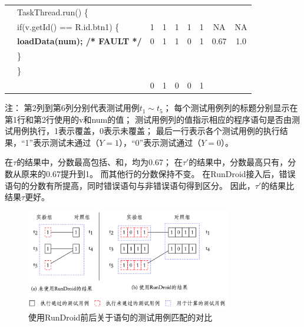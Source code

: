 \begin{table}[!ht]
\begin{center}
\begin{tabular}{|rl*{5} {|c}|c|c|}
			&TaskThread.run() \{                             &   &   &   &   &   &      &       \\
			
			&\quad if(v.getId() == R.id.btn1) \{                          & 1 & 1 & 1 & 1 & 1 &  NA   & NA \\
			
			&\quad \quad \textbf{loadData(num); /* FAULT */} & 0 & 1 & 1 & 0 & 1 & 0.67    & 1.0  \\
			
			&\quad\}                                         &   &   &   &   &   &  &                \\
			
			&\}                                              &   &   &   &   &   &   &              \\
			
			\hline
			
			&                                                  & 0 & 1 & 0 & 0 & 1 &   &               \\
									\hline
		\end{tabular}
	\end{center}
\wuhao
	注： 第2列到第6列分别代表测试用例$t_1\sim t_5$；
	每个测试用例列的标题分别显示在第1行和第2行使用的v和num的值；
	测试用例列的值指示相应的程序语句是否由测试用例执行，1表示覆盖，0表示未覆盖；   
	最后一行表示各个测试用例的执行结果，“1”表示测试未通过（$Y=1$），“0”表示测试通过（$Y=0$）。  \par
	
	
\end{table}





在$\tau$的结果中，分数最高包括、和，均为0.67；
在$\tau'$的结果中，分数最高只有，分数从原来的0.67提升到1。
而其他行的分数保持不变。
在RunDroid接入后，错误语句的分数有所提高，同时错误语句与非错误语句得到区分。
因此，$\tau'$的结果比结果$\tau$更好。


\begin{figure}[!ht]
	\begin{center}
		\includegraphics[width=0.8\textwidth]{./Figures/fault-localization.png}
	\end{center}
	\caption{使用RunDroid前后关于语句的测试用例匹配的对比}
	\label{fig:motivationResultTreatment}
\end{figure}


